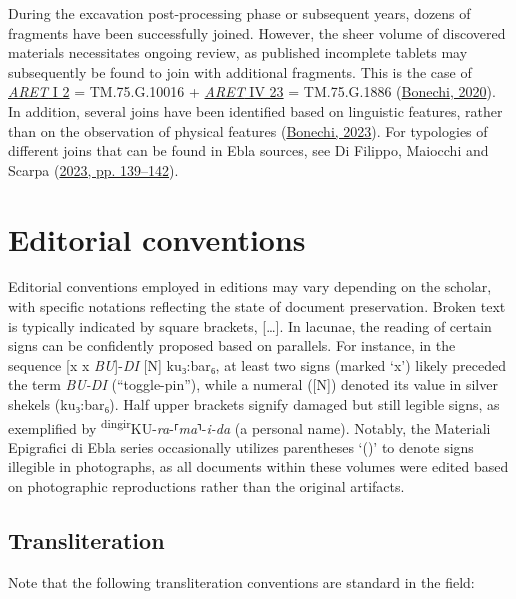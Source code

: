 \documentclass[
]{book}
\begin{document}
During the excavation post-processing phase or subsequent years, dozens of fragments have been successfully joined. However, the sheer volume of discovered materials necessitates ongoing review, as published incomplete tablets may subsequently be found to join with additional fragments. This is the case of \href{http://ebda.cnr.it/tablet/view/3}{\emph{ARET} I 2} = TM.75.G.10016 + \href{http://ebda.cnr.it/tablet/view/1109}{\emph{ARET} IV 23} = TM.75.G.1886 (\protect\hyperlink{ref-Bonechi2020c}{Bonechi, 2020}). In addition, several joins have been identified based on linguistic features, rather than on the observation of physical features (\protect\hyperlink{ref-Bonechi2023b}{Bonechi, 2023}). For typologies of different joins that can be found in Ebla sources, see Di Filippo, Maiocchi and Scarpa (\protect\hyperlink{ref-DiFilippoEtAl2023a}{2023, pp. 139--142}).

\hypertarget{editorial-conventions}{%
\section{Editorial conventions}\label{editorial-conventions}}

Editorial conventions employed in editions may vary depending on the scholar, with specific notations reflecting the state of document preservation. Broken text is typically indicated by square brackets, {[}\ldots{]}. In lacunae, the reading of certain signs can be confidently proposed based on parallels. For instance, in the sequence {[}x x \emph{BU}{]}-\emph{DI} {[}N{]} ku₃:bar₆, at least two signs (marked `x') likely preceded the term \emph{BU-DI} (``toggle-pin''), while a numeral ({[}N{]}) denoted its value in silver shekels (ku₃:bar₆). Half upper brackets signify damaged but still legible signs, as exemplified by \textsuperscript{dingir}KU-\emph{ra}-⸢\emph{ma}⸣-\emph{i-da} (a personal name). Notably, the Materiali Epigrafici di Ebla series occasionally utilizes parentheses `()' to denote signs illegible in photographs, as all documents within these volumes were edited based on photographic reproductions rather than the original artifacts.

\hypertarget{transliteration}{%
\subsection{Transliteration}\label{transliteration}}

Note that the following transliteration conventions are standard in the field:
\end{document}
